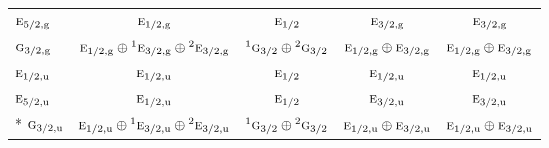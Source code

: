 \documentclass[10pt,a4paper]{article}
\numberwithin{equation}{section}
\newcommand{\irr}[1]{\text{\normalfont\scshape #1}}
\newcommand{\conjpair}[1]{{}^{#1}}
\newcommand{\ptag}[1]{\mathrm{#1}}
\begin{document}
{\begin{longtable}{@{}lcccc@{}}
$\irr{e}_{5/2,\ptag{g}}$ & $\irr{e}_{1/2,\ptag{g}}$ & $\irr{e}_{1/2}$ & $\irr{e}_{3/2,\ptag{g}}$ & $\irr{e}_{3/2,\ptag{g}}$\\
$\irr{g}_{3/2,\ptag{g}}$ & $\irr{e}_{1/2,\ptag{g}}\oplus \conjpair{1}\irr{e}_{3/2,\ptag{g}}\oplus \conjpair{2}\irr{e}_{3/2,\ptag{g}}$ & $\conjpair{1}\irr{g}_{3/2}\oplus \conjpair{2}\irr{g}_{3/2}$ & $\irr{e}_{1/2,\ptag{g}}\oplus \irr{e}_{3/2,\ptag{g}}$ & $\irr{e}_{1/2,\ptag{g}}\oplus \irr{e}_{3/2,\ptag{g}}$\\
$\irr{e}_{1/2,\ptag{u}}$ & $\irr{e}_{1/2,\ptag{u}}$ & $\irr{e}_{1/2}$ & $\irr{e}_{1/2,\ptag{u}}$ & $\irr{e}_{1/2,\ptag{u}}$\\
$\irr{e}_{5/2,\ptag{u}}$ & $\irr{e}_{1/2,\ptag{u}}$ & $\irr{e}_{1/2}$ & $\irr{e}_{3/2,\ptag{u}}$ & $\irr{e}_{3/2,\ptag{u}}$\\*
$\irr{g}_{3/2,\ptag{u}}$ & $\irr{e}_{1/2,\ptag{u}}\oplus \conjpair{1}\irr{e}_{3/2,\ptag{u}}\oplus \conjpair{2}\irr{e}_{3/2,\ptag{u}}$ & $\conjpair{1}\irr{g}_{3/2}\oplus \conjpair{2}\irr{g}_{3/2}$ & $\irr{e}_{1/2,\ptag{u}}\oplus \irr{e}_{3/2,\ptag{u}}$ & $\irr{e}_{1/2,\ptag{u}}\oplus \irr{e}_{3/2,\ptag{u}}$\\
\bottomrule\end{longtable}}
\end{document}
